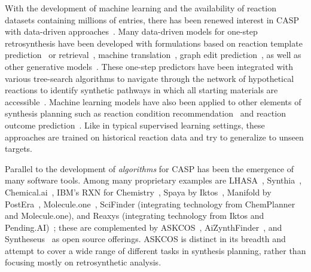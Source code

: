 \documentclass[pdflatex,sn-mathphys-num]{sn-jnl}%
\theoremstyle{thmstyleone}%
\theoremstyle{thmstyletwo}%
\theoremstyle{thmstylethree}%
\begin{document}
With the development of machine learning and the availability of reaction datasets containing millions of entries, there has been renewed interest in CASP with data-driven approaches~\citep{tu_predictive_2023,schwaller_machine_2022}. Many data-driven models for one-step retrosynthesis have been developed with formulations based on reaction template prediction~\citep{dai_retrosynthesis_2019,chen_deep_2021} or retrieval~\citep{coley_computer-assisted_2017,xie_retrosynthesis_2023}, machine translation~\citep{tu_permutation_2022,tetko_state---art_2020,zhong_root-aligned_2022}, graph edit prediction~\citep{sacha_molecule_2021,somnath_learning_2021}, as well as other generative models~\citep{igashov_retrobridge_2023,gainski_retrogfn_2024}. These one-step predictors have been integrated with various tree-search algorithms to navigate through the network of hypothetical reactions to identify synthetic pathways in which all starting materials are accessible~\citep{heifets_construction_2012,segler_planning_2018,kishimoto_depth-first_2019,schwaller_predicting_2020,chen_retro_2020}. Machine learning models have also been applied to other elements of synthesis planning such as reaction condition recommendation~\citep{gao_using_2018,maser_multilabel_2021,kwon_generative_2022,qian_predictive_2023,chen_enhancing_2024} and reaction outcome prediction~\citep{schwaller_molecular_2019,tu_permutation_2022,coley_graph-convolutional_2019,sacha_molecule_2021,bradshaw_generative_2019,bi_non-autoregressive_2021}. Like in typical supervised learning settings, these approaches are trained on historical reaction data and try to generalize to unseen targets.


Parallel to the development of \emph{algorithms} for CASP has been the emergence of many software tools. Among many proprietary examples are LHASA~\citep{corey_computer-assisted_1972}, Synthia~\citep{grzybowski_chematica_2018}, Chemical.ai~\citep{Chemical.ai}, IBM's RXN for Chemistry~\citep{RXNforChemistry}, Spaya by Iktos~\citep{Spaya}, Manifold by PostEra~\citep{Manifold}, Molecule.one~\citep{Molecule.one}, SciFinder (integrating technology from ChemPlanner~\citep{ChemPlanner} and Molecule.one), and Reaxys (integrating technology from Iktos and Pending.AI)~\citep{ReaxysRetro}; these are complemented by ASKCOS~\citep{coley_robotic_2019}, AiZynthFinder~\citep{genheden_aizynthfinder_2020}, and Syntheseus~\citep{maziarz_re-evaluating_2024} as open source offerings. ASKCOS is distinct in its breadth and attempt to cover a wide range of different tasks in synthesis planning, rather than focusing mostly on retrosynthetic analysis. 
\end{document}
